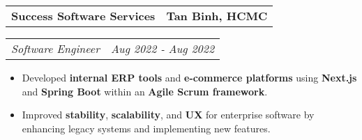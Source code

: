\documentclass[11pt,letterpaper]{article}
\makeatletter
\newcommand{\headerrow}[2]
{\begin{tabular*}{\linewidth}{l@{\extracolsep{\fill}}r}
#1 &
#2 \\
\end{tabular*}}
\makeatother
\begin{document}
\headerrow
{\large\textbf{Success Software Services}}
{\textbf{Tan Binh, HCMC}}
\headerrow
{\emph{Software Engineer}}
{\emph{Aug 2022 - Aug 2022}}
\begin{itemize}[leftmargin=1em,noitemsep]
    \item Developed \textbf{internal ERP tools} and \textbf{e-commerce platforms} using \textbf{Next.js} and \textbf{Spring Boot} within an \textbf{Agile Scrum framework}.
    \item Improved \textbf{stability}, \textbf{scalability}, and \textbf{UX} for enterprise software by enhancing legacy systems and implementing new features.
\end{itemize}
\end{document}
